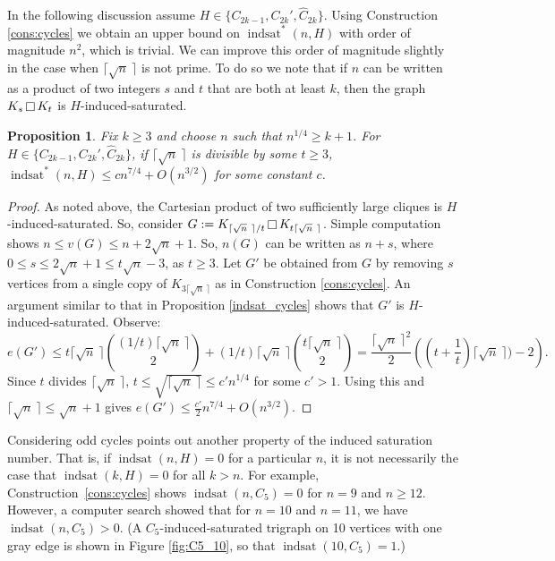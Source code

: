 \documentclass[12pt]{amsart}
\theoremstyle{plain}
\newtheorem{prop}[thm]{Proposition}
\theoremstyle{definition}
\theoremstyle{remark}
\newcommand{\indsat}[2]{\ensuremath{\operatorname{indsat}(#1,#2)}\xspace}
\newcommand{\sis}[2]{\ensuremath{{\operatorname{indsat}}^*(#1,#2)}\xspace}
\newcommand{\cartprod}{\mathop{\scriptsize\Box}}
\begin{document}
In the following discussion assume $H \in \{C_{2k-1}, C_{2k}', \hat C_{2k}\}$.  Using Construction \ref{cons:cycles} we obtain an upper bound on $\sis{n}{H}$ with order of magnitude $n^2$, which is trivial.  We can improve this order of magnitude slightly in the case when $\lceil \sqrt{n}~ \rceil$ is not prime.  To do so we note that if $n$ can be written as a product of two integers $s$ and $t$ that are both at least $k$, then the graph $K_s \cartprod K_t$ is $H$-induced-saturated.


\begin{prop}
Fix $k \ge 3$ and choose $n$ such that $n^{1/4} \ge k + 1$.  For $H \in \{C_{2k-1}, C_{2k}', \hat C_{2k}\}$, if $\lceil \sqrt{n}~ \rceil$ is divisible by some $t \ge 3$, $\sis{n}{H} \le cn^{7/4} + O(n^{3/2})$ for some constant $c$.
\end{prop}

\begin{proof}
As noted above, the Cartesian product of two sufficiently large cliques is $H$-induced-saturated.  So, consider $G := K_{\lceil \sqrt{n}~\rceil/t} \cartprod K_{t\lceil \sqrt{n}~ \rceil}$.  Simple computation shows $n \le v(G) \le n + 2\sqrt{n} + 1$.  So, $n(G)$ can be written as $n + s$, where $0 \le s \le 2\sqrt{n} + 1 \le t\sqrt{n} - 3$, as $t \ge 3$.  Let $G'$ be obtained from $G$ by removing $s$ vertices from a single copy of $K_{3\lceil \sqrt{n}~\rceil}$ as in Construction \ref{cons:cycles}.  An argument similar to that in Proposition \ref{indsat_cycles} shows that $G'$ is $H$-induced-saturated.  Observe: $$e(G') \le t\lceil\sqrt{n}~\rceil \binom{(1/t)\lceil \sqrt{n}~\rceil}{2} + (1/t)\lceil\sqrt{n}~\rceil \binom{t\lceil \sqrt{n}~\rceil}{2} = \frac{\lceil \sqrt{n}~\rceil^2}{2}\left(\left(t+\frac{1}{t}\right)\lceil\sqrt{n}~\rceil) - 2\right).$$
Since $t$ divides $\lceil\sqrt{n}~\rceil$, $t \le \sqrt{\lceil \sqrt{n}~\rceil}\le c'n^{1/4}$ for some $c' > 1$.  Using this and $\lceil\sqrt{n}~\rceil \le \sqrt{n} + 1$ gives $e(G') \le \frac{c'}{2}n^{7/4} + O(n^{3/2})$.
\end{proof}


Considering odd cycles  points out another property of the induced saturation number.
That is, if $\indsat{n}{H}=0$ for a particular $n$, it is not necessarily the case that $\indsat{k}{H}=0$ for all $k > n$. For example,  Construction~\ref{cons:cycles} shows $\indsat{n}{C_5}=0$ for $n = 9$ and $n \geq 12$.
However, a computer search showed that for $n=10$ and $n=11$, we have $\indsat{n}{C_5} > 0$.
(A $C_5$-induced-saturated trigraph on 10 vertices with one gray edge is shown in Figure \ref{fig:C5_10}, so that $\indsat{10}{C_5}=1$.)
\end{document}
